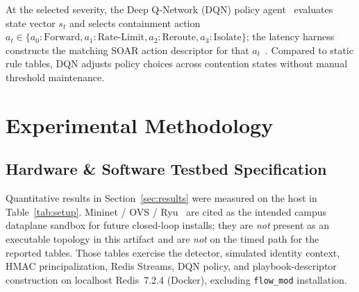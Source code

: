 \documentclass[conference,a4paper]{IEEEtran}
\begin{document}
At the selected severity, the Deep Q-Network (DQN) policy agent~\cite{b5} evaluates state vector $s_t$ and selects containment action $a_t \in \{a_0: \text{Forward}, a_1: \text{Rate-Limit}, a_2: \text{Reroute}, a_3: \text{Isolate}\}$; the latency harness constructs the matching SOAR action descriptor for that $a_t$~\cite{b18}. Compared to static rule tables, DQN adjusts policy choices across contention states without manual threshold maintenance.

\section{Experimental Methodology}
\subsection{Hardware \& Software Testbed Specification}
Quantitative results in Section~\ref{sec:results} were measured on the host in Table~\ref{tab:setup}. Mininet / OVS / Ryu~\cite{b10,b11,b19} are cited as the intended campus dataplane sandbox for future closed-loop installs; they are \emph{not} present as an executable topology in this artifact and are \emph{not} on the timed path for the reported tables. Those tables exercise the detector, simulated identity context, HMAC principalization, Redis Streams, DQN policy, and playbook-descriptor construction on localhost Redis~7.2.4 (Docker), excluding \texttt{flow\_mod} installation.

\begin{table}[htbp]
\caption{Measurement Host for Headline Tables (Section~\ref{sec:results})}
\label{tab:setup}
\begin{center}
\end{center}
\end{table}
\end{document}
